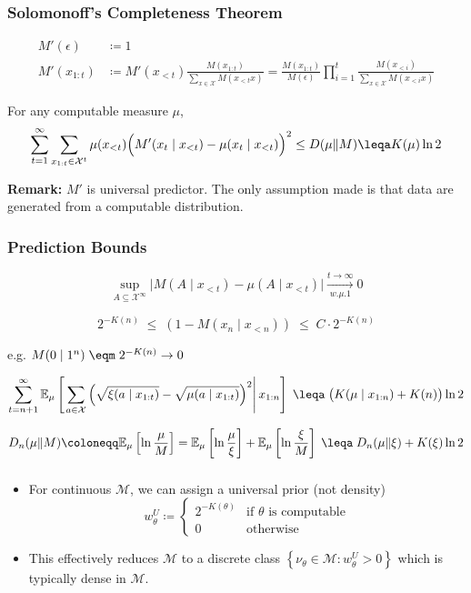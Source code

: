 \documentclass[UTF8,11pt,colorlinks,compress,openany]{beamer}%
\begin{document}
\begin{frame}\frametitle{Solomonoff's Completeness Theorem}
	\begin{align*}
	M'(\epsilon)&\coloneqq 1\\
	M'(x_{1:t})&\coloneqq M'(x_{<t})\frac{M(x_{1:t})}{\sum\limits_{x\in\mathcal{X}}M(x_{<t}x)}=\frac{M(x_{1:t})}{M(\epsilon)}\prod\limits_{i=1}^t\frac{M(x_{<i})}{\sum\limits_{x\in\mathcal{X}}M(x_{<i}x)}
	\end{align*}
	\begin{theorem}
		For any computable measure $\mu$,
		\[\sum\limits_{t=1}^\infty\sum\limits_{x_{1:t}\in\mathcal{X}^t}\mu(x_{<t})\Big(M'(x_t\mid x_{<t})-\mu(x_t\mid x_{<t})\Big)^2\leq D(\mu\|M) \leqa K(\mu)\ln2\]
	\end{theorem}
\textbf{Remark:} $M'$ is universal predictor. The only assumption made is that data are generated from a computable distribution.
\end{frame}

\begin{frame}\frametitle{Prediction Bounds}
\setlength\abovedisplayskip{0pt}
\setlength\belowdisplayskip{0pt}
\begin{theorem}
\[
 \sup_{A\subseteq\mathcal{X}^\infty} \big|M(A\mid x_{<t})-\mu(A\mid x_{<t})\big| \xrightarrow[w.\mu.1]{t\to\infty} 0
\]
\end{theorem}
\begin{theorem}
\[
 2^{-K(n)} \;\leq\; (1-M(x_n\mid x_{<n})) \;\leq\; C\cdot 2^{-K(n)}
\]
\end{theorem}
e.g. $M(0\mid 1^n) \;\eqm\; 2^{-K(n)}\to 0$
\begin{theorem}
\[
 \sum\limits_{t=n+1}^\infty \mathbb{E}_\mu\left[\left.\sum\limits_{a\in\mathcal{X}}\left(\sqrt{\xi(a\mid x_{1:t})}-\sqrt{\mu(a\mid x_{1:t})}\right)^2\right|x_{1:n}\right] \;\leqa\; \big(K(\mu\mid x_{1:n})+K(n)\big)\ln 2
\]
\end{theorem}
\begin{theorem}
\[
 D_n(\mu\|M)\coloneqq \mathbb{E}_\mu\left[\ln\frac{\mu}{M}\right]=\mathbb{E}_\mu\left[\ln\frac{\mu}{\xi}\right]+\mathbb{E}_\mu\left[\ln\frac{\xi}{M}\right] \;\leqa\; D_n(\mu\|\xi)+K(\xi)\ln2
\]
\end{theorem}
\end{frame}

\begin{frame}\frametitle{}
\begin{itemize}
	\item For continuous $\mathcal{M}$, we can assign a universal prior (not density)
	\[w_\theta^U\coloneqq
	\begin{cases}
		2^{-K(\theta)} & \mbox{if $\theta$ is computable}\\
		0 & \mbox{otherwise}
	\end{cases}
	\]
	\item This effectively reduces $\mathcal{M}$ to a discrete class $\left\{\nu_\theta\in\mathcal{M}: w_\theta^U>0\right\}$ which is typically dense in $\mathcal{M}$.
\end{itemize}
\end{frame}
\end{document}

